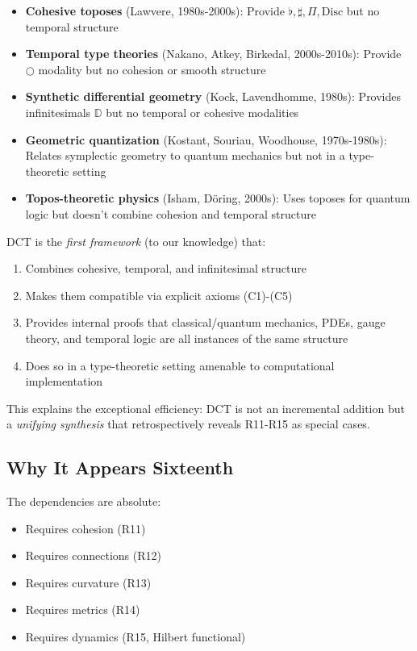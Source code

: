 \documentclass[11pt]{article}
\theoremstyle{definition}
\begin{document}
\begin{itemize}
\item \textbf{Cohesive toposes} (Lawvere, 1980s-2000s): Provide $\flat, \sharp, \Pi, \text{Disc}$ but no temporal structure

\item \textbf{Temporal type theories} (Nakano, Atkey, Birkedal, 2000s-2010s): Provide $\bigcirc$ modality but no cohesion or smooth structure

\item \textbf{Synthetic differential geometry} (Kock, Lavendhomme, 1980s): Provides infinitesimals $\mathbb{D}$ but no temporal or cohesive modalities

\item \textbf{Geometric quantization} (Kostant, Souriau, Woodhouse, 1970s-1980s): Relates symplectic geometry to quantum mechanics but not in a type-theoretic setting

\item \textbf{Topos-theoretic physics} (Isham, Döring, 2000s): Uses toposes for quantum logic but doesn't combine cohesion and temporal structure
\end{itemize}

DCT is the \emph{first framework} (to our knowledge) that:
\begin{enumerate}
\item Combines cohesive, temporal, and infinitesimal structure
\item Makes them compatible via explicit axioms (C1)-(C5)
\item Provides internal proofs that classical/quantum mechanics, PDEs, gauge theory, and temporal logic are all instances of the same structure
\item Does so in a type-theoretic setting amenable to computational implementation
\end{enumerate}

This explains the exceptional efficiency: DCT is not an incremental addition but a \emph{unifying synthesis} that retrospectively reveals R11-R15 as special cases.

\subsection{Why It Appears Sixteenth}

The dependencies are absolute:
\begin{itemize}
\item Requires cohesion (R11)
\item Requires connections (R12)
\item Requires curvature (R13)
\item Requires metrics (R14)
\item Requires dynamics (R15, Hilbert functional)
\end{itemize}
\end{document}
